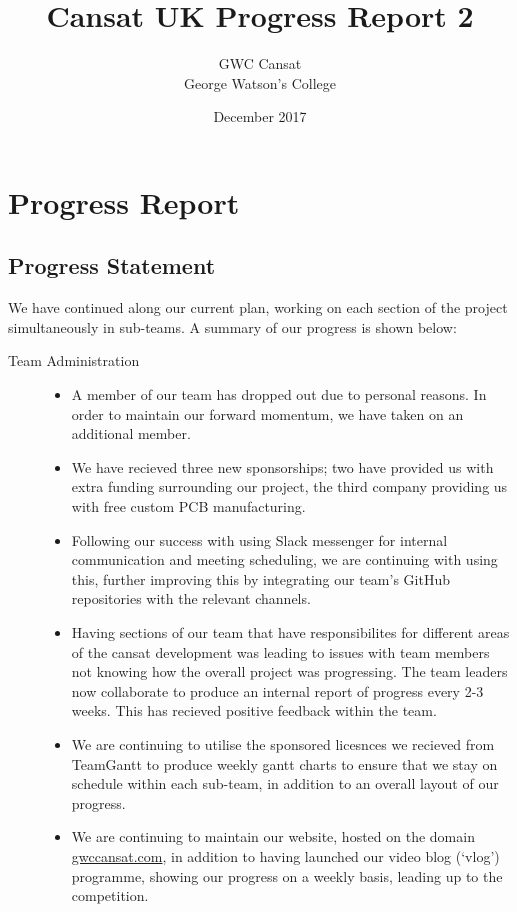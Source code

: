 \documentclass{report}
\title{\bf Cansat UK Progress Report 2}
\author{
	GWC Cansat\\
	George Watson's College	
}
\date{December 2017}
\begin{document}
\maketitle
\tableofcontents
{}

\chapter{Progress Report}
	\section{Progress Statement}%
	We have continued along our current plan, working on each 
	section of the project simultaneously in sub-teams. A summary 
	of our progress is shown below:

	\begin{description}
		\item[Team Administration] \hfill \begin{itemize}
			\item A member of our team has dropped out due to personal
			reasons. In order to maintain our forward momentum, we
			have taken on an additional member.
			\item We have recieved three new sponsorships; two have 
			provided us with extra funding surrounding our project,
			the third company providing us with free custom PCB 
			manufacturing.
			\item Following our success with using Slack messenger for 
			internal communication and meeting scheduling,
			we are continuing with using this, further improving this
			by integrating our team's GitHub repositories with the relevant
			channels.
			\item Having sections of our team that have responsibilites for
			different	areas of the cansat development was leading to issues
			with team members not knowing how the overall	project was 
			progressing. The team leaders now collaborate to produce an
			internal report of progress every 2-3 weeks. This has recieved
			positive feedback within the team.
			\item We are continuing to utilise the sponsored licesnces we 
			recieved from TeamGantt to produce weekly gantt charts
			to ensure that we stay on schedule within each sub-team, in
			addition to an overall layout of our progress.
			\item We are continuing to maintain our website, hosted on the
			domain \url{gwccansat.com}, in addition to having launched our
			video blog (`vlog') programme, showing our progress on a weekly
			basis, leading up to the competition.
		\end{itemize}
		

\end{description}
\end{document}
